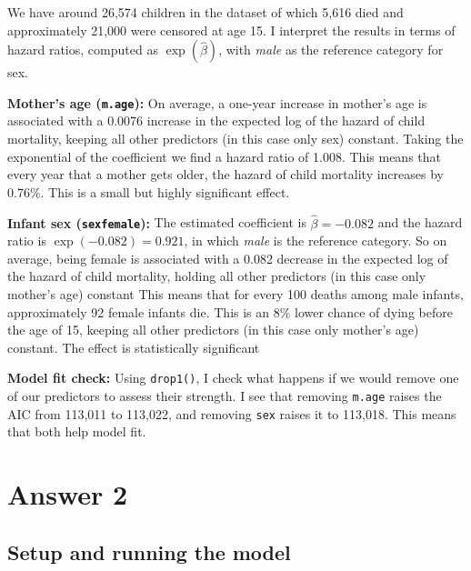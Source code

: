 \documentclass[12pt,letterpaper]{article}
\begin{document}
	\newpage
	
	\noindent We have around 26,574 children in the dataset of which 5,616 died and approximately 21,000 were censored at age 15. I interpret the results in terms of hazard ratios, computed as $\exp(\hat{\beta})$, with \textit{male} as the reference category for sex.\newline
	

\noindent \textbf{Mother's age (\texttt{m.age}):} On average, a one-year increase in mother's age is associated with a 0.0076 increase in the expected log of the hazard of child mortality, keeping all other predictors (in this case only sex) constant. Taking the exponential of the coefficient we find a hazard ratio of 1.008. This means that every year that a mother gets older, the hazard of child mortality increases by 0.76\%. This is a small but highly significant effect.\newline

\noindent \textbf{Infant sex (\texttt{sexfemale}):} The estimated coefficient is $\hat{\beta} = -0.082$ and the hazard ratio is $\exp(-0.082) = 0.921$, in which \textit{male} is the reference category. So on average, being female is associated with a 0.082 decrease in the expected log of the hazard of child mortality, holding all other predictors (in this case only mother's age) constant This means that for every 100 deaths among male infants, approximately 92 female infants die. This is an 8\% lower chance of dying before the age of 15, keeping all other predictors (in this case only mother's age) constant. The effect is statistically significant \newline

\noindent \textbf{Model fit check:} Using \texttt{drop1()}, I check what happens if we would remove one of our predictors to assess their strength. I see that removing \texttt{m.age} raises the AIC from 113,011 to 113,022, and removing \texttt{sex} raises it to 113,018. This means that both help model fit.  

\section{Answer 2}

\subsection{Setup and running the model}
\end{document}
